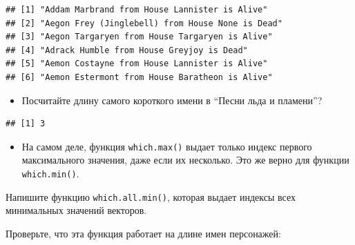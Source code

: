 \documentclass[]{book}
\providecommand{\tightlist}{%
  \setlength{\itemsep}{0pt}\setlength{\parskip}{0pt}}
\begin{document}
\begin{verbatim}
## [1] "Addam Marbrand from House Lannister is Alive"   
## [2] "Aegon Frey (Jinglebell) from House None is Dead"
## [3] "Aegon Targaryen from House Targaryen is Alive"  
## [4] "Adrack Humble from House Greyjoy is Dead"       
## [5] "Aemon Costayne from House Lannister is Alive"   
## [6] "Aemon Estermont from House Baratheon is Alive"
\end{verbatim}

\begin{itemize}
\tightlist
\item
  Посчитайте длину самого короткого имени в ``Песни льда и пламени''?
\end{itemize}

\begin{verbatim}
## [1] 3
\end{verbatim}

\begin{itemize}
\tightlist
\item
  На самом деле, функция \texttt{which.max()} выдает только индекс
  первого максимального значения, даже если их несколько. Это же верно
  для функции \texttt{which.min()}.
\end{itemize}

Напишите функцию \texttt{which.all.min()}, которая выдает индексы всех
минимальных значений векторов.

Проверьте, что эта функция работает на длине имен персонажей:
\end{document}
